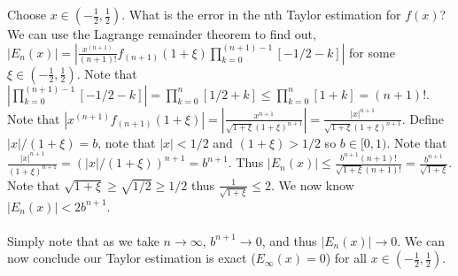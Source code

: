 \documentclass[12pt]{article}
\theoremstyle{homework}
\begin{document}
Choose $x\in (-\frac{1}{2},\frac{1}{2})$.  What is the error in the nth Taylor estimation for $f(x)$?  We can use the Lagrange remainder theorem to find out, $|E_n(x)|=|\frac{x^{(n+1)}}{{(n+1)}!} f_{(n+1)}(1+\xi)\prod_{k=0}^{{(n+1)}-1} [-1/2-k]|$ for some $\xi\in (-\frac{1}{2},\frac{1}{2})$.  Note that $|\prod_{k=0}^{{(n+1)}-1} [-1/2-k]|=\prod_{k=0}^{n} [1/2+k]\leq \prod_{k=0}^{n} [1+k]=(n+1)!$.  Note that $|x^{(n+1)}f_{(n+1)}(1+\xi)|=|\frac{x^{n+1}}{\sqrt{1+\xi}(1+\xi)^{n+1}}|=\frac{|x|^{n+1}}{\sqrt{1+\xi}(1+\xi)^{n+1}}$.  Define $|x|/(1+\xi)=b$, note that $|x|<1/2$ and $(1+\xi)>1/2$ so $b\in [0,1)$.  Note that $\frac{|x|^{n+1}}{(1+\xi)^{n+1}}=(|x|/(1+\xi))^{n+1}=b^{n+1}$.  Thus $|E_n(x)|\leq \frac{b^{n+1}(n+1)!}{\sqrt{1+\xi}{(n+1)}!}= \frac{b^{n+1}}{\sqrt{1+\xi}}$.  Note that $\sqrt{1+\xi}\geq \sqrt{1/2}\geq 1/2$ thus $\frac{1}{\sqrt{1+\xi}}\leq 2$.  We now know $|E_n(x)|<2b^{n+1}$.\\\\
Simply note that as we take $n\rightarrow \infty$, $b^{n+1}\rightarrow 0$, and thus $|E_n(x)|\rightarrow 0$.  We can now conclude our Taylor estimation is exact ($E_\infty (x)=0$) for all $x\in (-\frac{1}{2},\frac{1}{2})$.
\end{document}
